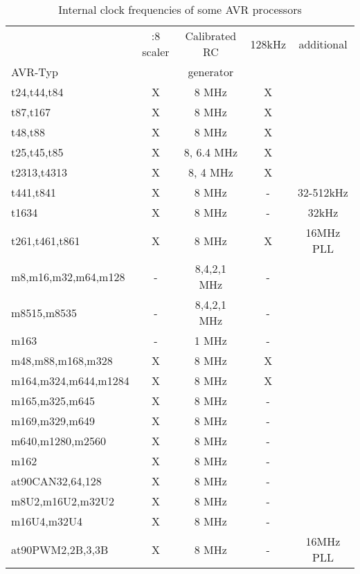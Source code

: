 \begin{table}[H]
  \begin{center}
    \begin{tabular}{| l || c | c | c | c |}
    \hline
                      & :8 scaler & Calibrated RC & 128kHz & additional \\
  AVR-Typ             &           &  generator    &        & \\
    \hline
    \hline
 t24,t44,t84          &  X        & 8 MHz         & X      &   \\
 t87,t167             &  X        & 8 MHz         & X      & \\
 t48,t88              &  X        & 8 MHz         & X      & \\
    \hline
 t25,t45,t85          &  X        & 8, 6.4 MHz    & X      & \\
    \hline
 t2313,t4313          &  X        & 8, 4 MHz      & X      &  \\
    \hline
 t441,t841            &  X        & 8 MHz         & -      & 32-512kHz \\
    \hline
 t1634                &  X        & 8 MHz         & -      & 32kHz \\
    \hline
 t261,t461,t861       &  X        & 8 MHz         & X      & 16MHz PLL \\
    \hline
 m8,m16,m32,m64,m128  &  -        & 8,4,2,1 MHz   & -      & \\
 m8515,m8535          &  -        & 8,4,2,1 MHz   & -      & \\
    \hline
 m163                 &  -        & 1 MHz         & -      &  \\
    \hline
 m48,m88,m168,m328    &  X        & 8 MHz         & X      & \\
 m164,m324,m644,m1284 & X         & 8 MHz         & X      & \\
    \hline
 m165,m325,m645       &  X        & 8 MHz         & -      & \\
 m169,m329,m649       &  X        & 8 MHz         & -      & \\
 m640,m1280,m2560     &  X        & 8 MHz         & -      & \\
 m162                 &  X        & 8 MHz         & -      & \\
 at90CAN32,64,128     &  X        & 8 MHz         & -      & \\
 m8U2,m16U2,m32U2     &  X        & 8 MHz         & -      & \\
 m16U4,m32U4          &  X        & 8 MHz         & -      & \\
    \hline
 at90PWM2,2B,3,3B     &  X        & 8 MHz         & -      & 16MHz PLL \\
    \hline
    \end{tabular}
  \end{center}
  \caption{Internal clock frequencies of some AVR processors}
  \label{tab:clockInt}
\end{table}
